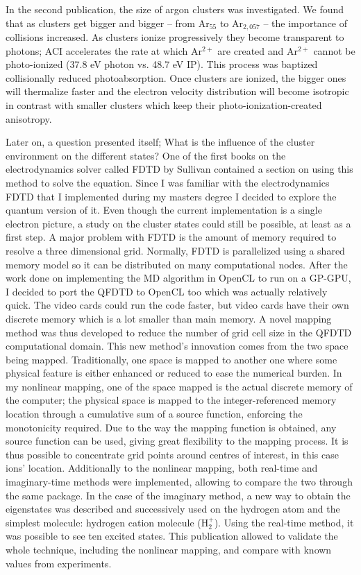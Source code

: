 In the second publication, the size of argon clusters was investigated. We found
that as clusters get bigger and bigger -- from Ar$_{55}$ to Ar$_{2,057}$ --
the importance of collisions increased. As clusters ionize progressively they
become transparent to photons; ACI accelerates the rate at which Ar$^{2+}$ are
created and Ar$^{2+}$ cannot be photo-ionized (37.8 eV photon vs. 48.7 eV IP).
This process was baptized collisionally reduced photoabsorption. Once clusters
are ionized, the bigger ones will thermalize faster and the electron velocity
distribution will become isotropic in contrast with smaller clusters which
keep their photo-ionization-created anisotropy.


Later on, a question presented itself; What is the influence of the cluster
environment on the different states? One of the first books on the
electrodynamics solver called FDTD by Sullivan contained a section on using
this method to solve the \schrodinger equation. Since I was familiar with
the electrodynamics FDTD that I implemented during my masters degree I decided
to explore the quantum version of it. Even though the current implementation is
a single electron picture, a study on the cluster states could still be possible,
at least as a first step. A major problem with FDTD is the amount of memory
required to resolve a three dimensional grid. Normally, FDTD is parallelized
using a shared memory model so it can be distributed on many
computational nodes. After the work done on implementing the MD algorithm in
OpenCL to run on a GP-GPU, I decided to port the QFDTD to OpenCL too
which was actually relatively quick. The video cards could run the code faster,
but video cards have their own discrete memory which is a lot smaller than main
memory. A novel mapping method was thus developed to reduce the number of grid
cell size in the QFDTD computational domain. This new method's innovation comes
from the two space being mapped. Traditionally, one space is mapped to another
one where some physical feature is either enhanced or reduced to ease the numerical
burden. In my nonlinear mapping, one of the space mapped is the actual
discrete memory of the computer; the physical space is mapped to the
integer-referenced memory location through a cumulative sum of a source function,
enforcing the monotonicity required. Due to the way the mapping function is
obtained, any source function can be used, giving great flexibility to the
mapping process. It is thus possible to concentrate grid points around centres
of interest, in this case ions' location. Additionally to the nonlinear mapping,
both real-time and imaginary-time methods were implemented, allowing to compare
the two through the same package. In the case of the imaginary method, a new
way to obtain the eigenstates was described and successively used on the
hydrogen atom and the simplest molecule: hydrogen cation molecule (H$_{2}^{+}$).
Using the real-time method, it was possible to see ten excited states. This
publication allowed to validate the whole technique, including the nonlinear
mapping, and compare with known values from experiments.

